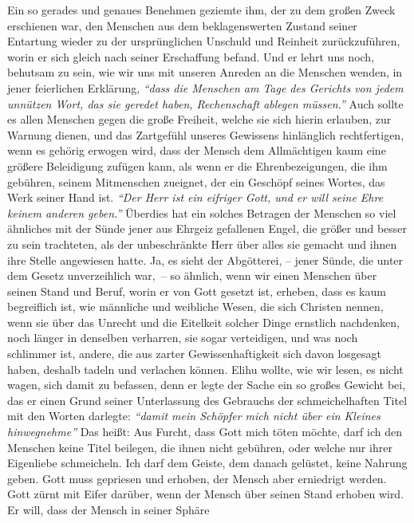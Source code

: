 Ein so gerades und genaues Benehmen geziemte ihm, der zu dem großen Zweck
erschienen war, den Menschen aus dem beklagenswerten Zustand seiner Entartung
wieder zu der ursprünglichen Unschuld und Reinheit zurückzuführen, worin er sich
gleich nach seiner Erschaffung befand. Und er lehrt uns noch, behutsam zu sein,
wie wir uns mit unseren Anreden an die Menschen wenden, in jener feierlichen
Erklärung,
\textit{"`dass die Menschen am Tage des Gerichts von jedem unnützen Wort, das
sie geredet haben, Rechenschaft ablegen
müssen."'}
Auch sollte es allen Menschen gegen die große Freiheit, welche sie sich hierin
erlauben, zur Warnung dienen, und das Zartgefühl unseres Gewissens hinlänglich
rechtfertigen, wenn es gehörig erwogen wird, dass der Mensch dem Allmächtigen
kaum eine größere Beleidigung zufügen kann, als wenn er die Ehrenbezeigungen,
die ihm gebühren, seinem Mitmenschen zueignet, der ein Geschöpf seines Wortes,
das Werk seiner Hand ist.
\textit{"`Der Herr ist ein eifriger Gott, und er will seine
Ehre keinem anderen geben."'} Überdies hat ein solches Betragen der Menschen so
viel ähnliches mit der Sünde jener aus Ehrgeiz gefallenen Engel, die größer und
besser zu sein trachteten, als der unbeschränkte Herr über alles sie gemacht und
ihnen ihre Stelle angewiesen hatte. Ja, es sieht der Abgötterei, -- jener
Sünde,
die unter dem Gesetz unverzeihlich war,~-- so ähnlich, wenn wir einen Menschen
über seinen Stand und Beruf, worin er von Gott gesetzt ist, erheben, dass es
kaum
begreiflich ist, wie männliche und weibliche Wesen, die sich Christen nennen,
wenn sie über das Unrecht und die Eitelkeit solcher Dinge ernstlich nachdenken,
noch länger in denselben verharren, sie sogar verteidigen, und was noch
schlimmer ist, andere, die aus zarter Gewissenhaftigkeit sich davon losgesagt
haben, deshalb tadeln und verlachen können. Elihu wollte, wie wir lesen, es
nicht wagen, sich damit zu befassen, denn er legte der Sache ein so großes
Gewicht bei, das er einen Grund seiner Unterlassung des Gebrauchs der
schmeichelhaften Titel mit den Worten darlegte:
\textit{"`damit mein Schöpfer mich nicht
über ein Kleines hinwegnehme"'} Das heißt: Aus Furcht, dass Gott mich töten
möchte,
darf ich den Menschen keine Titel beilegen, die ihnen nicht gebühren, oder
welche nur ihrer Eigenliebe schmeicheln. Ich darf dem Geiste, dem
danach gelüstet, keine Nahrung geben. Gott muss gepriesen und erhoben, der
Mensch aber erniedrigt werden. Gott zürnt mit Eifer darüber,
wenn der Mensch
über seinen Stand erhoben wird. Er will, dass der Mensch in seiner Sphäre
